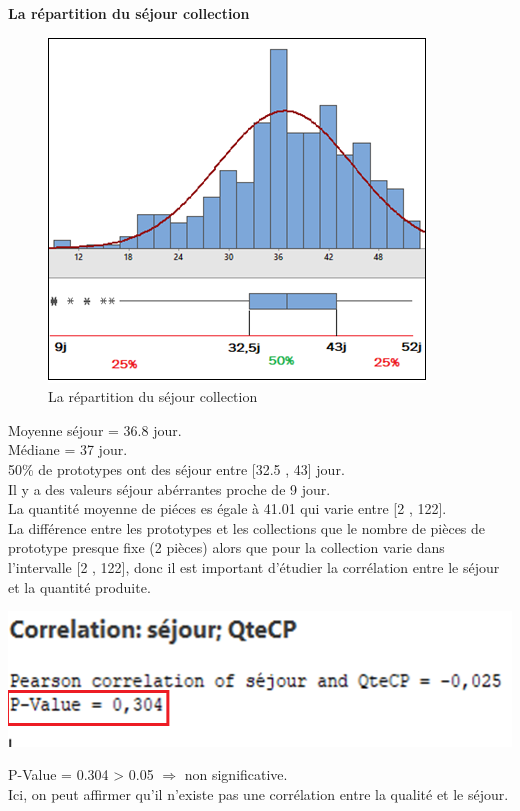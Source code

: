 \documentclass[12pt, a4paper]{thesis}
\begin{document}
\textbf{La répartition du séjour collection}


\begin{figure}[!h]
\begin{center}
\includegraphics[scale=0.85]{reparcoll.png}
\caption{La répartition du séjour collection}
\end{center}
\end{figure}
Moyenne séjour = 36.8 jour.\\
Médiane = 37 jour. \\
50\% de prototypes ont des séjour entre [32.5 , 43] jour.\\
Il y a des valeurs séjour abérrantes proche de 9 jour.\\ 
La quantité moyenne de piéces es égale à 41.01 qui varie entre [2 , 122].\\





La différence entre les prototypes et les collections que le nombre de pièces de prototype presque fixe (2 pièces) alors que pour la collection varie dans l'intervalle [2 , 122], donc il est important d'étudier la corrélation entre le séjour et la quantité produite.

\begin{center}
\includegraphics[scale=0.8]{corr.png}
\end{center}
P-Value = 0.304 > 0.05 $\Longrightarrow$ non significative.\\
Ici, on peut affirmer qu'il n'existe pas une corrélation entre la qualité et le séjour.\\
 
\end{document}
